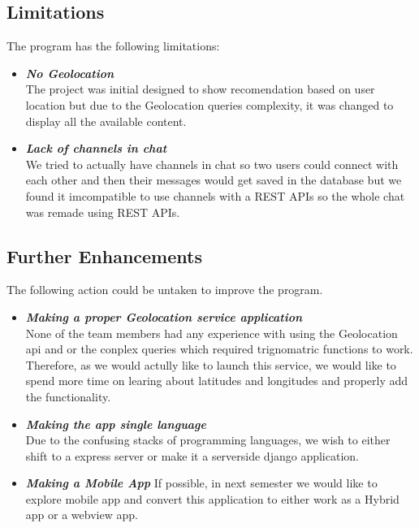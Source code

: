 \documentclass[12pt]{article}
\begin{document}
\begin{itemize}
\subsection{Limitations}
\vspace*{5mm}
The program has the following limitations:
\begin{itemize}
    \item \textit{\textbf{No Geolocation}}\\
        The project was initial designed to show recomendation based on user location but due to the Geolocation queries complexity, it was changed to display all the available content.
    \item \textit{\textbf{Lack of channels in chat}}\\
        We tried to actually have channels in chat so two users could connect with each other and then their messages would get saved in the database but we found it imcompatible to use channels with a REST APIs so the whole chat was remade using REST APIs.
\end{itemize}
\vspace*{5mm}
\subsection{Further Enhancements}
\vspace*{5mm}
The following action could be untaken to improve the program.
\begin{itemize}
    \item \textit{\textbf{Making a proper Geolocation service application}}\\
        None of the team members had any experience with using the Geolocation api and or the conplex queries which required trignomatric functions to work. Therefore, as we would actully like to launch this service, we would like to spend more time on learing about latitudes and longitudes and properly add the functionality.
    \item \textit{\textbf{Making the app single language}}\\
        Due to the confusing stacks of programming languages, we wish to either shift to a express server or make it a serverside django application.
    \item  \textit{\textbf{Making a Mobile App}} 
        If possible, in next semester we would like to explore mobile app and convert this application to either work as a Hybrid app or a webview app.
\end{itemize}
\clearpage


\end{itemize}
\end{document}
